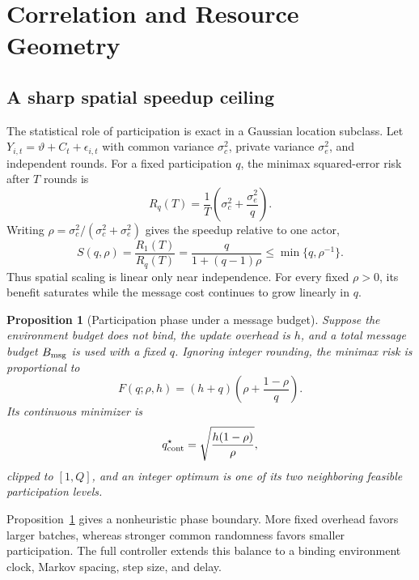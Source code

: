 \documentclass[journal]{IEEEtran}
\newtheorem{proposition}{Proposition}
\begin{document}
\section{Correlation and Resource Geometry}
\subsection{A sharp spatial speedup ceiling}
The statistical role of participation is exact in a Gaussian location subclass.
Let $Y_{i,t}=\vartheta+C_t+\epsilon_{i,t}$ with common variance $\sigma_c^2$, private variance $\sigma_e^2$, and independent rounds.
For a fixed participation $q$, the minimax squared-error risk after $T$ rounds is
\begin{equation}
R_q(T)=\frac{1}{T}\left(\sigma_c^2+\frac{\sigma_e^2}{q}\right).
\label{eq:location-risk}
\end{equation}
Writing $\rho=\sigma_c^2/(\sigma_c^2+\sigma_e^2)$ gives the speedup relative to one actor,
\begin{equation}
S(q,\rho)=\frac{R_1(T)}{R_q(T)}
=\frac{q}{1+(q-1)\rho}
\le\min\{q,\rho^{-1}\}.
\label{eq:speedup}
\end{equation}
Thus spatial scaling is linear only near independence.
For every fixed $\rho>0$, its benefit saturates while the message cost continues to grow linearly in $q$.

\begin{proposition}[Participation phase under a message budget]
Suppose the environment budget does not bind, the update overhead is $h$, and a total message budget $B_{\rm msg}$ is used with a fixed $q$.
Ignoring integer rounding, the minimax risk is proportional to
\begin{equation}
F(q;\rho,h)=(h+q)\left(\rho+\frac{1-\rho}{q}\right).
\label{eq:participation-phase-objective}
\end{equation}
Its continuous minimizer is
\begin{equation}
q_{\rm cont}^\star=\sqrt{\frac{h(1-\rho)}{\rho}},
\label{eq:participation-phase}
\end{equation}
clipped to $[1,Q]$, and an integer optimum is one of its two neighboring feasible participation levels.
\label{prop:q-phase}
\end{proposition}

Proposition~\ref{prop:q-phase} gives a nonheuristic phase boundary.
More fixed overhead favors larger batches, whereas stronger common randomness favors smaller participation.
The full controller extends this balance to a binding environment clock, Markov spacing, step size, and delay.
\end{document}
